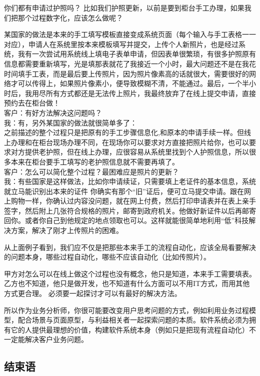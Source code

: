 你们都有申请过护照吗？
比如我们护照更新，以前是要到柜台手工办理，如果我们把那个过程数字化，应该怎么做呢？

某国家的做法是本来的手工填写模板直接变成系统页面（每个输入与手工表格一一对应），申请人在系统里按本来模板填写并提交，上传个人新照片，也是经过系统，我有一次尝试用系统线上填电子表单申请，但因表单很繁琐，有很多护照原有信息都需要重新填写，光是填那表就花了我接近一个小时，最大问题还不是在我花时间填手工表，而是最后要上传照片，因为照片像素高的话就很大，需要很好的网络才可以传得上，如果照片像素小，便导致模糊不清，不能通过。最后，一个半小时后，我用尽所有方式都还是无法传上照片，我最终放弃了在线上提交申请，直接预约去在柜台做！\\
客户：有好方法解决这问题吗？\\
我：有，另外某国家的做法就很简单多了：\\
之前描述的整个过程只是把原有的手工步骤信息化,和原本的申请手续一样。但线上办理和在柜台现场办理不同，在现场你可以要求对方直接把照片给你，也可以要求对方提供老护照，但在线上办理，应很容易从系统里找到个人护照信息，所以很多本来在柜台要手工填写的老护照信息就不需要再填了。\\
客户：怎么可以简化整个过程？最困难应是照片的更新？\\
我：有些国家是这样做法，比如你申请续证，只需要填上老证件的基本信息，系统就立马能识别出本来的证件
你确实有那个``旧''证后，便可立马提交申请。跟在网上购物一样，你确认过内容没问题，就在网上付费，然后打印申请表并在表上亲手签字，然后附上几张符合规格的照片，邮寄到政府机关。他做好新证件以后再邮寄回你。或者你自己到他规定的地点领取也可以。这样就能很简单地利用``低''科技解决方案，解决了刚才上传照片的困难。

从上面例子看到，我们应不仅是把那些本来手工的流程自动化，应该全局看要解决的问题本身，哪些过程自动化，哪些不应该自动化（比如传照片）。

甲方对怎么可以在线上做这个过程也没有概念，他只是知道，本来手工需要填表。
乙方也不知道，他只是做开发，也不知道有什么方面可以不用IT方式，而用其他方式更合理。
必须要一起探讨才可以有最好的解决方法。

所以作为业务分析师，你很可能要改变用户思考问题的方式，例如利用业务过程模型，配合场景与页面原型，与利益相关者一起探索问题的本质。软件系统必须为拥有它的人提供最理想的价值，构建软件系统本身（例如只是把现有流程自动化）不一定能解决客户业务问题。

\hypertarget{ux5e38ux89c1ux95eeux9898}{%
\subsection{结束语}\label{ux5e38ux89c1ux95eeux9898}}

